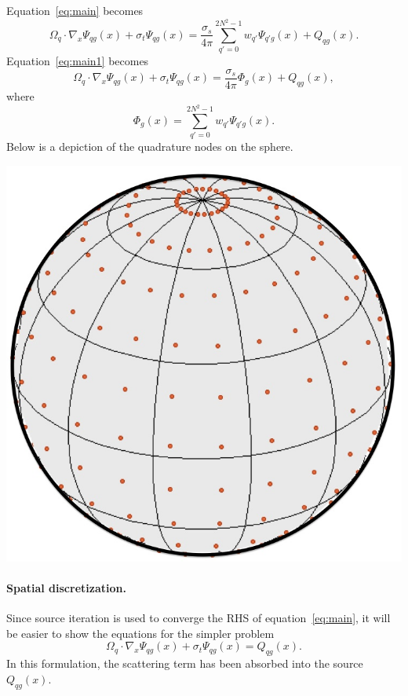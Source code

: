 \documentclass[12pt,letterpaper]{article}
\begin{document}
Equation~\eqref{eq:main} becomes
\begin{equation}
\Omega_q \cdot \nabla_x \Psi_{qg}(x) + \sigma_t \Psi_{qg}(x) = 
\frac{\sigma_s}{4\pi} \sum_{q'=0}^{2N^2-1} w_{q'} \Psi_{q'g}(x) + Q_{qg}(x).
\end{equation}
Equation~\eqref{eq:main1} becomes
\begin{equation}
\Omega_q \cdot \nabla_x \Psi_{qg}(x) + \sigma_t \Psi_{qg}(x) = 
\frac{\sigma_s}{4\pi} \Phi_{g}(x) + Q_{qg}(x),
\end{equation}
where
\begin{equation}
\Phi_g(x) = \sum_{q'=0}^{2N^2-1} w_{q'} \Psi_{q'g}(x).
\end{equation}
Below is a depiction of the quadrature nodes on the sphere.

\includegraphics[scale=0.5]{chebyshev-legendre.jpg}


\paragraph{Spatial discretization.}
Since source iteration is used to converge the RHS of equation~\eqref{eq:main}, it will be easier to show the equations for the simpler problem
\begin{equation}
\Omega_q \cdot \nabla_x \Psi_{qg}(x) + \sigma_t \Psi_{qg}(x) = Q_{qg}(x).
\end{equation}
In this formulation, the scattering term has been absorbed into the source $Q_{qg}(x)$.
\end{document}
